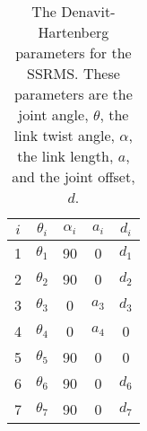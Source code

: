 \documentclass[onecolumn,10pt]{jhwhw}
\begin{document}
\begin{table}[h]
\centering
\begin{tabular}{*{5}{c}}
\toprule
$i$ & $\theta_i$ & $\alpha_i$ & $a_i$ & $d_i$ \\
\midrule
1 & $\theta_1$ & 90 &     0 & $d_1$ \\
2 & $\theta_2$ & 90 &     0 & $d_2$ \\
3 & $\theta_3$ &  0 & $a_3$ & $d_3$ \\
4 & $\theta_4$ &  0 & $a_4$ &     0 \\
5 & $\theta_5$ & 90 &     0 &     0 \\
6 & $\theta_6$ & 90 &     0 & $d_6$ \\
7 & $\theta_7$ & 90 &     0 & $d_7$ \\
\bottomrule
\end{tabular}
\caption{The Denavit-Hartenberg parameters for the SSRMS. These parameters are the joint angle, $\theta$, the link twist angle, $\alpha$, the link length, $a$, and the joint offset, $d$.}
\end{table}
\end{document}
